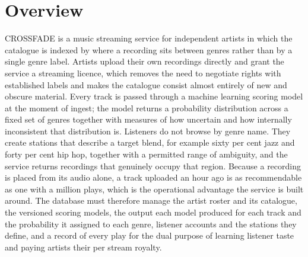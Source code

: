 \documentclass[11pt]{article}
\newcommand{\rae}[1]{\textcolor{ascc}{#1}}
\begin{document}
\clearpage
\section{Overview}\label{sec:ra}

CROSSFADE is a music streaming service for independent \rae{artists} in which the catalogue is indexed by where a \rae{recording} sits between \rae{genres} rather than by a single \rae{genre} label. \rae{Artists} upload their own \rae{recordings} directly and grant the service a streaming licence, which removes the need to negotiate rights with established labels and makes the catalogue consist almost entirely of new and obscure material. Every \rae{track} is passed through a machine learning \rae{scoring model} at the moment of ingest; the model returns a probability distribution across a fixed set of \rae{genres} together with measures of how uncertain and how internally inconsistent that distribution is. \rae{Listeners} do not browse by \rae{genre} name. They create \rae{stations} that describe a \rae{target blend}, for example sixty per cent jazz and forty per cent hip hop, together with a permitted range of ambiguity, and the service returns \rae{recordings} that genuinely occupy that region. Because a \rae{recording} is placed from its audio alone, a \rae{track} uploaded an hour ago is as recommendable as one with a million \rae{plays}, which is the operational advantage the service is built around. The database must therefore manage the \rae{artist} roster and its catalogue, the versioned \rae{scoring models}, \rae{the output each model produced for each track} and \rae{the probability it assigned to each genre}, \rae{listener} accounts and the \rae{stations} they define, and a record of every \rae{play} for the dual purpose of learning \rae{listener} taste and paying \rae{artists} their per stream royalty.
\end{document}
